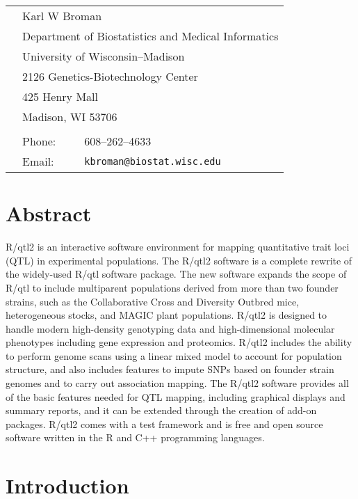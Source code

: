 \documentclass[12pt,letterpaper]{article}
\begin{document}
\begin{tabular}{lll}
 \\
 \hspace{1cm} & \multicolumn{2}{l}{Karl W Broman} \\
 & \multicolumn{2}{l}{Department of Biostatistics and Medical Informatics} \\
 & \multicolumn{2}{l}{University of Wisconsin--Madison} \\
 & \multicolumn{2}{l}{2126 Genetics-Biotechnology Center} \\
 & \multicolumn{2}{l}{425 Henry Mall} \\
 & \multicolumn{2}{l}{Madison, WI 53706} \\
 \\
 & Phone: & 608--262--4633 \\
 & Email: & \verb|kbroman@biostat.wisc.edu|
\end{tabular}


\newpage

\section*{Abstract}

R/qtl2 is an interactive software environment for mapping quantitative trait loci (QTL)
in experimental populations.
The R/qtl2 software is a complete rewrite of the widely-used R/qtl software package.
The new software expands the scope of R/qtl to include
multiparent populations derived from more than two founder strains, such as the
Collaborative Cross and Diversity Outbred mice, heterogeneous stocks, and
MAGIC plant populations. R/qtl2 is designed to handle modern high-density genotyping data
and high-dimensional molecular phenotypes including gene expression and proteomics.
R/qtl2 includes the ability to perform genome scans using a linear mixed model
to account for population structure, and also includes features to impute SNPs
based on founder strain genomes and to carry out association mapping.
The R/qtl2 software provides all of the basic features needed for QTL mapping,
including graphical displays and summary reports, and it can be extended
through the creation of add-on packages.
R/qtl2 comes with a test
framework and is free and open source software written in the R and
C++ programming languages.

\newpage

\section*{Introduction}
\end{document}
